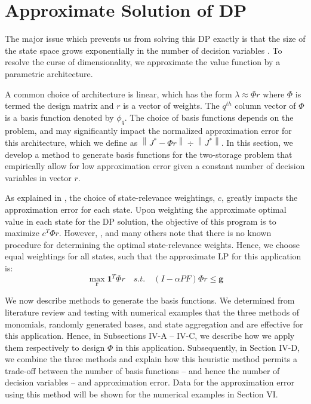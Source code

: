 \documentclass[conference]{IEEEtran}
\newcommand{\norm}[1]{\left\lVert#1\right\rVert}
\begin{document}
\section{Approximate Solution of DP}

The major issue which prevents us from solving this DP exactly is that the size of the state space grows exponentially in the number of decision variables \cite{deFarias:2003:LPA:970869.970918}. To resolve the curse of dimensionality, we approximate the value function by a parametric architecture. %

A common choice of architecture is linear, which has the form $\lambda\approx \Phi r$ where $\Phi$ is termed the design matrix and $r$ is a vector of weights. The $q^{th}$ column vector of $\Phi$ is a basis function denoted by $\phi_{q}$. The choice of basis functions depends on the problem, and may significantly impact the normalized approximation error for this architecture, which we define as $\norm{J^{*}-\Phi r}\div\norm{J^{*}}$. In this section, we develop a method to generate basis functions for the two-storage problem that empirically allow for low approximation error given a constant number of decision variables in vector $r$.

As explained in \cite{deFarias:2003:LPA:970869.970918}, the choice of state-relevance weightings, $c$, greatly impacts the approximation error for each state. Upon weighting the approximate optimal value in each state for the DP solution, the objective of this program is to maximize $c^{T}\Phi r$. However, \cite{deFarias:2003:LPA:970869.970918}, \cite{PatrascuReluEugen2004} and many others note that there is no known procedure for determining the optimal state-relevance weights. Hence, we choose equal weightings for all states, such that the approximate LP for this application is:
\begin{equation} \label{eq:ApproxLP}
    \max_{\boldsymbol{r}} \boldsymbol{1}^{T} \Phi r
    \hspace{1em}s.t.\hspace{1em}
    (I-\alpha PF)\Phi r \leq \boldsymbol{g}
\end{equation}

We now describe methods to generate the basis functions. We determined from literature review and testing with numerical examples that the three methods of monomials, randomly generated bases, and state aggregation and are effective for this application. Hence, in Subsections IV-A -- IV-C, we describe how we apply them respectively to design $\Phi$ in this application. Subsequently, in Section IV-D, we combine the three methods and explain how this heuristic method permits a trade-off between the number of basis functions -- and hence the number of decision variables -- and approximation error. Data for the approximation error using this method will be shown for the numerical examples in Section VI.
\end{document}
